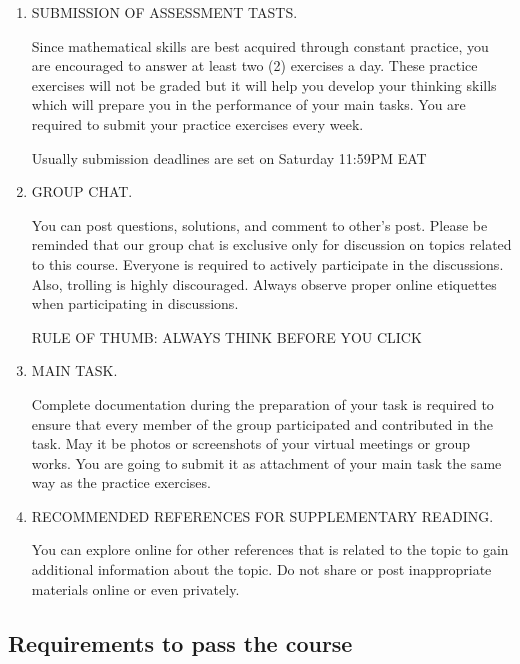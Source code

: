 \begin{enumerate}[label=\cb\arabic*.]
\item {\cb SUBMISSION OF ASSESSMENT TASTS.}

Since mathematical skills are best acquired through constant practice, you are encouraged to answer at least two (2) exercises a day. These practice exercises will not be graded but it will help you develop your thinking skills which will prepare you in the performance of your main tasks. You are required to submit your practice exercises every week.
\begin{center} {\cg Usually submission deadlines are set on Saturday 11:59PM EAT} \end{center}

\item  {\cb GROUP CHAT.}

You can post questions, solutions, and comment to other's post. Please be reminded that our group chat is exclusive only for discussion on topics related to this course. Everyone is required to actively participate in the discussions. Also, trolling is highly discouraged. Always observe proper online etiquettes when participating in discussions.
\begin{center} {\cb RULE OF THUMB: ALWAYS THINK BEFORE YOU CLICK} \end{center}

\item  {\cb MAIN TASK. }

Complete documentation during the preparation of your task is required to ensure that every member of the group participated and contributed in the task. May it be photos or screenshots of your virtual meetings or group works. You are going to submit it as attachment of your main task the same way as the practice exercises.



\item {\cb RECOMMENDED REFERENCES FOR SUPPLEMENTARY READING.} 

You can explore online for other references that is related to the topic to gain additional information about the topic. Do not share or post inappropriate materials online or even privately.
\end{enumerate}

\subsection*{Requirements to pass the course}

